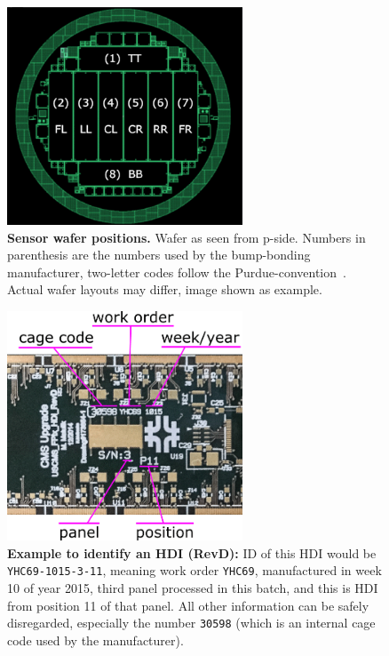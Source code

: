 \documentclass[12pt]{unlsilabsop}
\begin{document}
\begin{figure}[hH]
    \begin{center}
        \includegraphics[width=7cm]{img/SensorsWaferposPurdueconvention.png}
        \caption{\textbf{Sensor wafer positions.} Wafer as seen from p-side. Numbers in parenthesis are the numbers used by the bump-bonding manufacturer, two-letter codes follow the Purdue-convention~\cite{BBMnaming}. Actual wafer layouts may differ, image shown as example.}
        \label{fig:BBMwaferpos}
    \end{center}
\end{figure}

\begin{figure}[hH]
    \begin{center}
        \includegraphics[width=7cm]{img/HDIRevD_id.png}
        \caption{\textbf{Example to identify an HDI (RevD):} ID of this HDI would be \texttt{YHC69-1015-3-11}, meaning work order \texttt{YHC69}, manufactured in week 10 of year 2015, third panel processed in this batch, and this is HDI from position 11 of that panel. All other information can be safely disregarded, especially the number \texttt{30598} (which is an internal cage code used by the manufacturer).}
        \label{fig:HDI_SN_RevD}
    \end{center}
\end{figure}
\end{document}
